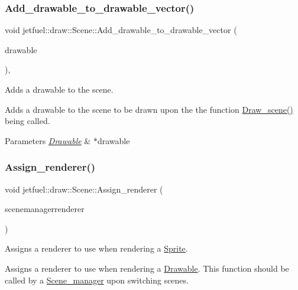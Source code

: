 \subsubsection{\texorpdfstring{Add\+\_\+drawable\+\_\+to\+\_\+drawable\+\_\+vector()}{Add\_drawable\_to\_drawable\_vector()}}
{\footnotesize\ttfamily void jetfuel\+::draw\+::\+Scene\+::\+Add\+\_\+drawable\+\_\+to\+\_\+drawable\+\_\+vector (\begin{DoxyParamCaption}\item[{\hyperlink{classjetfuel_1_1draw_1_1Drawable}{Drawable} $\ast$}]{drawable }\end{DoxyParamCaption})\hspace{0.3cm}{\ttfamily [inline]}, {\ttfamily [protected]}}



Adds a drawable to the scene. 

Adds a drawable to the scene to be drawn upon the the function \hyperlink{classjetfuel_1_1draw_1_1Scene_a80b9b5f38022b6c2af9921656f93056b}{Draw\+\_\+scene()} being called.


\begin{DoxyParams}{Parameters}
{\em \hyperlink{classjetfuel_1_1draw_1_1Drawable}{Drawable}} & $\ast$drawable \\
\hline
\end{DoxyParams}
\mbox{\label{classjetfuel_1_1draw_1_1Scene_a0cd111e8863ab2e9e78cd3b6144c64a8}} 
\subsubsection{\texorpdfstring{Assign\+\_\+renderer()}{Assign\_renderer()}}
{\footnotesize\ttfamily void jetfuel\+::draw\+::\+Scene\+::\+Assign\+\_\+renderer (\begin{DoxyParamCaption}\item[{S\+D\+L\+\_\+\+Renderer $\ast$}]{scenemanagerrenderer }\end{DoxyParamCaption})\hspace{0.3cm}{\ttfamily [inline]}}



Assigns a renderer to use when rendering a \hyperlink{classjetfuel_1_1draw_1_1Sprite}{Sprite}. 

Assigns a renderer to use when rendering a \hyperlink{classjetfuel_1_1draw_1_1Drawable}{Drawable}. This function should be called by a \hyperlink{classjetfuel_1_1draw_1_1Scene__manager}{Scene\+\_\+manager} upon switching scenes.


